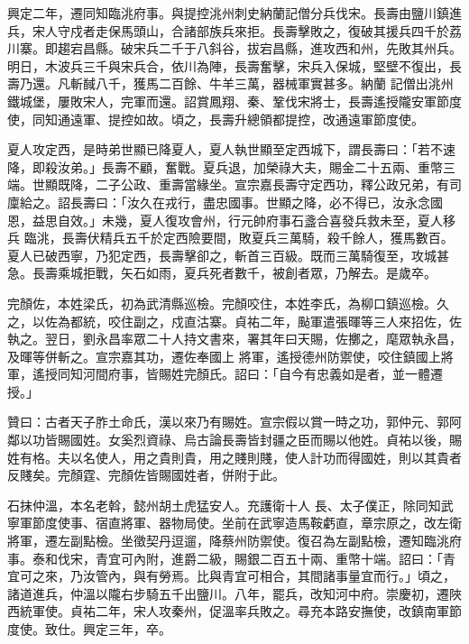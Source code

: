 \begin{pinyinscope}
 興定二年，遷同知臨洮府事。與提控洮州刺史納蘭記僧分兵伐宋。長壽由鹽川鎮進兵，宋人守戍者走保馬頭山，合諸部族兵來拒。長壽擊敗之，復破其援兵四千於荔川寨。即趨宕昌縣。破宋兵二千于八斜谷，拔宕昌縣，進攻西和州，先敗其州兵。明日，木波兵三千與宋兵合，依川為陣，長壽奮擊，宋兵入保城，堅壁不復出，長壽乃還。凡斬馘八千，獲馬二百餘、牛羊三萬，器械軍實甚多。納蘭
 記僧出洮州鐵城堡，屢敗宋人，完軍而還。詔賞鳳翔、秦、鞏伐宋將士，長壽遙授隴安軍節度使，同知通遠軍、提控如故。頃之，長壽升總領都提控，改通遠軍節度使。



 夏人攻定西，是時弟世顯已降夏人，夏人執世顯至定西城下，謂長壽曰：「若不速降，即殺汝弟。」長壽不顧，奮戰。夏兵退，加榮祿大夫，賜金二十五兩、重幣三端。世顯既降，二子公政、重壽當緣坐。宣宗嘉長壽守定西功，釋公政兄弟，有司廩給之。詔長壽曰：「汝久在戎行，盡忠國事。世顯之降，必不得已，汝永念國恩，益思自效。」未幾，夏人復攻會州，行元帥府事石盞合喜發兵救未至，夏人移兵
 臨洮，長壽伏精兵五千於定西險要間，敗夏兵三萬騎，殺千餘人，獲馬數百。夏人已破西寧，乃犯定西，長壽擊卻之，斬首三百級。既而三萬騎復至，攻城甚急。長壽乘城拒戰，矢石如雨，夏兵死者數千，被創者眾，乃解去。是歲卒。



 完顏佐，本姓梁氏，初為武清縣巡檢。完顏咬住，本姓李氏，為柳口鎮巡檢。久之，以佐為都統，咬住副之，戍直沽寨。貞祐二年，颭軍遣張暉等三人來招佐，佐執之。翌日，劉永昌率眾二十人持文書來，署其年曰天賜，佐擲之，麾眾執永昌，及暉等併斬之。宣宗嘉其功，遷佐奉國上
 將軍，遙授德州防禦使，咬住鎮國上將軍，遙授同知河間府事，皆賜姓完顏氏。詔曰：「自今有忠義如是者，並一體遷授。」



 贊曰：古者天子胙土命氏，漢以來乃有賜姓。宣宗假以賞一時之功，郭仲元、郭阿鄰以功皆賜國姓。女奚烈資祿、烏古論長壽皆封疆之臣而賜以他姓。貞祐以後，賜姓有格。夫以名使人，用之貴則貴，用之賤則賤，使人計功而得國姓，則以其貴者反賤矣。完顏霆、完顏佐皆賜國姓者，併附于此。



 石抹仲溫，本名老斡，懿州胡土虎猛安人。充護衛十人
 長、太子僕正，除同知武寧軍節度使事、宿直將軍、器物局使。坐前在武寧造馬鞍虧直，章宗原之，改左衛將軍，遷左副點檢。坐徵契丹逗遛，降蔡州防禦使。復召為左副點檢，遷知臨洮府事。泰和伐宋，青宜可內附，進爵二級，賜銀二百五十兩、重幣十端。詔曰：「青宜可之來，乃汝管內，與有勞焉。比與青宜可相合，其間諸事量宜而行。」頃之，諸道進兵，仲溫以隴右步騎五千出鹽川。八年，罷兵，改知河中府。崇慶初，遷陜西統軍使。貞祐二年，宋人攻秦州，促溫率兵敗之。尋充本路安撫使，改鎮南軍節度使。致仕。興定三年，卒。




\end{pinyinscope}
